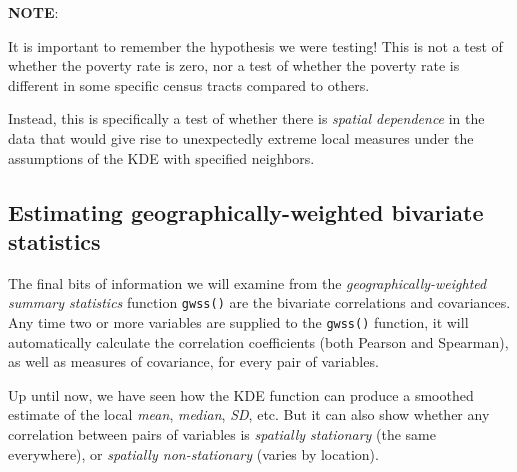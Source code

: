 \documentclass[
]{book}
\newenvironment{Shaded}{\begin{snugshade}}{\end{snugshade}}
\newcommand{\AttributeTok}[1]{\textcolor[rgb]{0.77,0.63,0.00}{#1}}
\newcommand{\FunctionTok}[1]{\textcolor[rgb]{0.00,0.00,0.00}{#1}}
\newcommand{\NormalTok}[1]{#1}
\newcommand{\SpecialCharTok}[1]{\textcolor[rgb]{0.00,0.00,0.00}{#1}}
\newcommand{\StringTok}[1]{\textcolor[rgb]{0.31,0.60,0.02}{#1}}
\newenvironment{rmdcaution}[1]
  {
  \begin{itemize}
  \renewcommand{\labelitemi}{
    \raisebox{-.7\height}[0pt][0pt]{
      {\setkeys{Gin}{width=3em,keepaspectratio}\texttt{[image: images/\#1]}}
    }
  }
  \setlength{\fboxsep}{1em}
  \begin{caution}
  \item
  }
  {
  \end{caution}
  \end{itemize}
  }
\begin{document}
\begin{rmdcaution}{caution}
\textbf{NOTE}:

It is important to remember the hypothesis we were testing! This is not a test of whether the poverty rate is zero, nor a test of whether the poverty rate is different in some specific census tracts compared to others.

Instead, this is specifically a test of whether there is \emph{spatial dependence} in the data that would give rise to unexpectedly extreme local measures under the assumptions of the KDE with specified neighbors.

\end{rmdcaution}

\hypertarget{estimating-geographically-weighted-bivariate-statistics}{%
\subsection{Estimating geographically-weighted bivariate statistics}\label{estimating-geographically-weighted-bivariate-statistics}}

The final bits of information we will examine from the \emph{geographically-weighted summary statistics} function \texttt{gwss()} are the bivariate correlations and covariances. Any time two or more variables are supplied to the \texttt{gwss()} function, it will automatically calculate the correlation coefficients (both Pearson and Spearman), as well as measures of covariance, for every pair of variables.

Up until now, we have seen how the KDE function can produce a smoothed estimate of the local \emph{mean}, \emph{median}, \emph{SD}, etc. But it can also show whether any correlation between pairs of variables is \emph{spatially stationary} (the same everywhere), or \emph{spatially non-stationary} (varies by location).

\begin{Shaded}
\end{Shaded}
\end{document}
